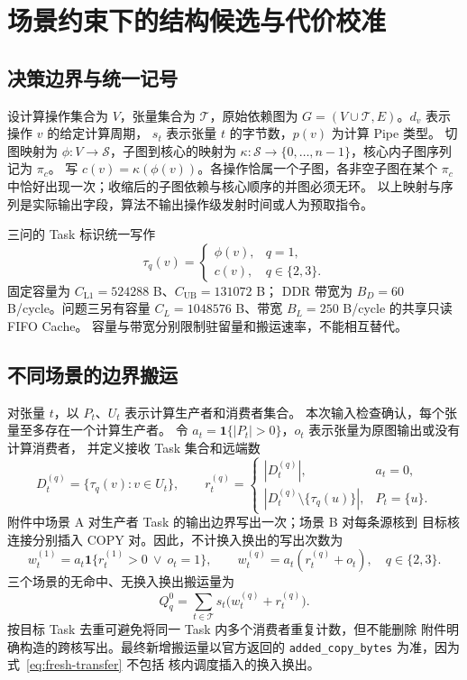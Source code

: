 \section{场景约束下的结构候选与代价校准}

\subsection{决策边界与统一记号}
设计算操作集合为 $V$，张量集合为 $\mathcal T$，原始依赖图为
$G=(V\cup\mathcal T,E)$。$d_v$ 表示操作 $v$ 的给定计算周期，
$s_t$ 表示张量 $t$ 的字节数，$p(v)$ 为计算 Pipe 类型。
切图映射为 $\phi:V\to\mathcal S$，子图到核心的映射为
$\kappa:\mathcal S\to\{0,\ldots,n-1\}$，核心内子图序列记为 $\pi_c$。
写 $c(v)=\kappa(\phi(v))$。各操作恰属一个子图，各非空子图在某个
$\pi_c$ 中恰好出现一次；收缩后的子图依赖与核心顺序的并图必须无环。
以上映射与序列是实际输出字段，算法不输出操作级发射时间或人为预取指令。

三问的 Task 标识统一写作
\begin{equation}
 \tau_q(v)=
 \begin{cases}\phi(v),&q=1,\\c(v),&q\in\{2,3\}.\end{cases}
 \label{eq:fresh-task}
\end{equation}
固定容量为 $C_{\mathrm{L1}}=524288$ B、$C_{\mathrm{UB}}=131072$ B；
DDR 带宽为 $B_D=60$ B/cycle。问题三另有容量
$C_L=1048576$ B、带宽 $B_L=250$ B/cycle 的共享只读 FIFO Cache。
容量与带宽分别限制驻留量和搬运速率，不能相互替代。

\subsection{不同场景的边界搬运}
对张量 $t$，以 $P_t$、$U_t$ 表示计算生产者和消费者集合。
本次输入检查确认，每个张量至多存在一个计算生产者。
令 $a_t=\mathbf1\{|P_t|>0\}$，$o_t$ 表示张量为原图输出或没有计算消费者，
并定义接收 Task 集合和远端数
\begin{equation}
 D_t^{(q)}=\{\tau_q(v):v\in U_t\},\qquad
 r_t^{(q)}=
 \begin{cases}|D_t^{(q)}|,&a_t=0,\\
 |D_t^{(q)}\setminus\{\tau_q(u)\}|,&P_t=\{u\}.
 \end{cases}
\end{equation}
附件中场景 A 对生产者 Task 的输出边界写出一次；场景 B 对每条源核到
目标核连接分别插入 COPY 对。因此，不计换入换出的写出次数为
\begin{equation}
 w_t^{(1)}=a_t\mathbf1\{r_t^{(1)}>0\ \lor\ o_t=1\},\qquad
 w_t^{(q)}=a_t(r_t^{(q)}+o_t),\quad q\in\{2,3\}.
 \label{eq:fresh-write-count}
\end{equation}
三个场景的无命中、无换入换出搬运量为
\begin{equation}
 Q_q^0=\sum_{t\in\mathcal T}s_t\bigl(w_t^{(q)}+r_t^{(q)}\bigr).
 \label{eq:fresh-transfer}
\end{equation}
按目标 Task 去重可避免将同一 Task 内多个消费者重复计数，但不能删除
附件明确构造的跨核写出。最终新增搬运量以官方返回的
\texttt{added\_copy\_bytes} 为准，因为式~\eqref{eq:fresh-transfer} 不包括
核内调度插入的换入换出。

